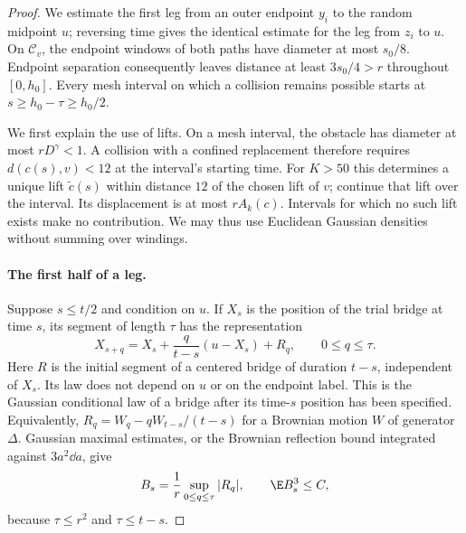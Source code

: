 \begin{proof}
We estimate the first leg from an outer endpoint $y_i$ to the random
midpoint $u$; reversing time gives the identical estimate for the leg
from $z_i$ to $u$.  On $\mathcal C_v$, the endpoint windows of both
paths have diameter at most $s_0/8$.  Endpoint separation consequently
leaves distance at least $3s_0/4>r$ throughout $[0,h_0]$.
Every mesh interval on which a collision remains possible starts at
$s\ge h_0-\tau\ge h_0/2$.

We first explain the use of lifts.  On a mesh interval, the obstacle has
diameter at most $rD^\gamma<1$.  A collision with a confined replacement
therefore requires $d(c(s),v)<12$ at the interval's starting time.  For
$K>50$ this determines a unique lift $\widetilde c(s)$ within distance
$12$ of the chosen lift of $v$; continue that lift over the interval.
Its displacement is at most $rA_k(c)$.  Intervals for which no such lift
exists make no contribution.  We may thus use Euclidean Gaussian
densities without summing over windings.

\paragraph{The first half of a leg.}
Suppose $s\le t/2$ and condition on $u$.  If $X_s$ is the position of
the trial bridge at time $s$, its segment of length $\tau$ has the
representation
\begin{equation}\label{bridge:markov-segment}
 X_{s+q}=X_s+\frac{q}{t-s}(u-X_s)+R_q,
 \qquad 0\le q\le\tau.
\end{equation}
Here $R$ is the initial segment of a centered bridge of duration $t-s$,
independent of $X_s$.  Its law does not depend on $u$ or on the endpoint
label.  This is the Gaussian conditional law of a bridge after its
time-$s$ position has been specified.  Equivalently,
$R_q=W_q-qW_{t-s}/(t-s)$ for a Brownian motion $W$ of generator $\Delta$.
Gaussian maximal estimates, or the Brownian reflection bound integrated
against $3a^2\dd a$, give
\begin{equation}\label{bridge:noise-moment}
 B_s=\frac1r\sup_{0\le q\le\tau}|R_q|,
 \qquad \E B_s^3\le C,
\end{equation}
because $\tau\le r^2$ and $\tau\le t-s$.


\end{proof}
